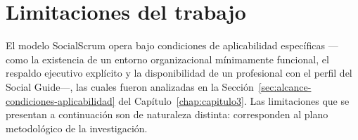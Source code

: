 \section{Limitaciones del trabajo}
\label{sec:limitaciones}

El modelo SocialScrum opera bajo condiciones de aplicabilidad específicas ---como la existencia de un entorno organizacional mínimamente funcional, el respaldo ejecutivo explícito y la disponibilidad de un profesional con el perfil del Social Guide---, las cuales fueron analizadas en la Sección~\ref{sec:alcance-condiciones-aplicabilidad} del Capítulo~\ref{chap:capitulo3}. Las limitaciones que se presentan a continuación son de naturaleza distinta: corresponden al plano metodológico de la investigación.

